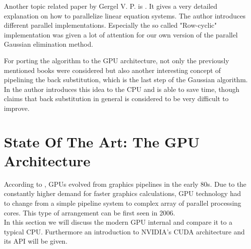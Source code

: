 \documentclass[draft, final]{vutinfth} %
\begin{document}
	Another topic related paper by Gergel V. P. is \cite{parmeth}. It gives a very detailed explanation on how to parallelize linear equation systems. The author introduces different parallel implementations. Especially the so called "Row-cyclic" implementation was given a lot of attention for our own version of the parallel Gaussian elimination method.

	For porting the algorithm to the GPU architecture, not only the previously mentioned books were considered but also another interesting concept of pipelining the back substitution, which is the last step of the Gaussian algorithm. In \cite{pipelinecomp} the author introduces this idea to the CPU and is able to save time, though \cite{opac-b1133063} claims that back substitution in general is considered to be very difficult to improve.

\chapter{State Of The Art: The GPU Architecture}
	According to \cite{Kirk:2010:PMP:1841511}, GPUs evolved from graphics pipelines in the early 80s. Due to the constantly higher demand for faster graphics calculations, GPU technology had to change from a simple pipeline system to complex array of parallel processing cores. %
	This type of arrangement can be first seen in 2006.\\
	In this section we will discuss the modern GPU internal and compare it to a typical CPU. Furthermore an introduction to NVIDIA's CUDA architecture and its API will be given.
\end{document}
